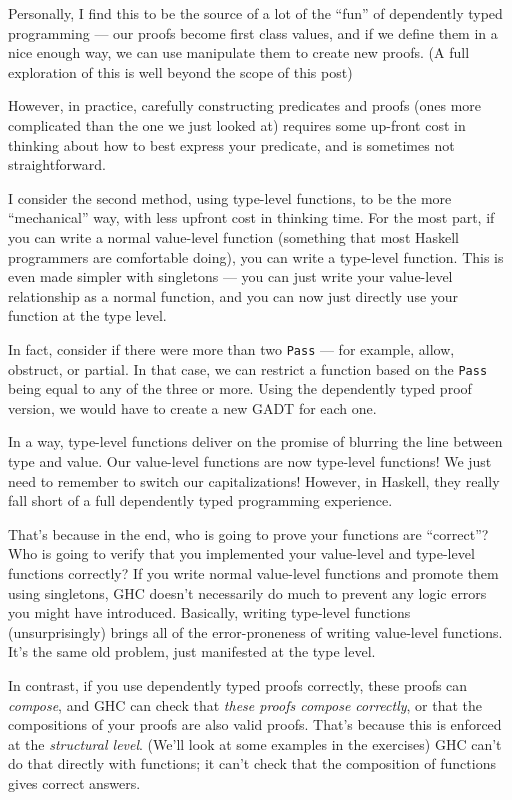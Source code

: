 \documentclass[]{article}
\begin{document}
Personally, I find this to be the source of a lot of the ``fun'' of dependently
typed programming --- our proofs become first class values, and if we define
them in a nice enough way, we can use manipulate them to create new proofs. (A
full exploration of this is well beyond the scope of this post)

However, in practice, carefully constructing predicates and proofs (ones more
complicated than the one we just looked at) requires some up-front cost in
thinking about how to best express your predicate, and is sometimes not
straightforward.

I consider the second method, using type-level functions, to be the more
``mechanical'' way, with less upfront cost in thinking time. For the most part,
if you can write a normal value-level function (something that most Haskell
programmers are comfortable doing), you can write a type-level function. This is
even made simpler with singletons --- you can just write your value-level
relationship as a normal function, and you can now just directly use your
function at the type level.

In fact, consider if there were more than two \texttt{Pass} --- for example,
allow, obstruct, or partial. In that case, we can restrict a function based on
the \texttt{Pass} being equal to any of the three or more. Using the dependently
typed proof version, we would have to create a new GADT for each one.

In a way, type-level functions deliver on the promise of blurring the line
between type and value. Our value-level functions are now type-level functions!
We just need to remember to switch our capitalizations! However, in Haskell,
they really fall short of a full dependently typed programming experience.

That's because in the end, who is going to prove your functions are ``correct''?
Who is going to verify that you implemented your value-level and type-level
functions correctly? If you write normal value-level functions and promote them
using singletons, GHC doesn't necessarily do much to prevent any logic errors
you might have introduced. Basically, writing type-level functions
(unsurprisingly) brings all of the error-proneness of writing value-level
functions. It's the same old problem, just manifested at the type level.

In contrast, if you use dependently typed proofs correctly, these proofs can
\emph{compose}, and GHC can check that \emph{these proofs compose correctly}, or
that the compositions of your proofs are also valid proofs. That's because this
is enforced at the \emph{structural level}. (We'll look at some examples in the
exercises) GHC can't do that directly with functions; it can't check that the
composition of functions gives correct answers.
\end{document}
